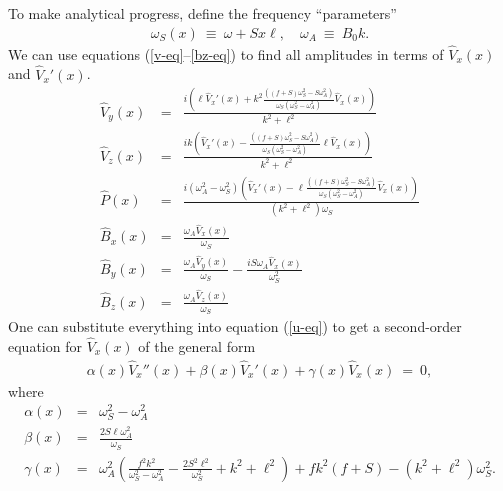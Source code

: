 \documentclass[openacc]{rsproca_new}%
\newcommand\Beq{\begin{eqnarray}}
\newcommand\Eeq{\end{eqnarray}}
\begin{document}
To make analytical progress, define the frequency ``parameters'' 
\Beq
\omega_{S}(x) \ \equiv \ \omega + S x \ell, \quad \omega_{A}  \ \equiv \ B_{0} k.
\Eeq
We can use equations (\ref{v-eq}--\ref{bz-eq}) to find all amplitudes in terms of $\hat{V}_{x}(x)$ and $\hat{V}_{x}'(x)$. 
\Beq
\hat{V}_{y}(x) &=& \frac{i \left(\ell 
   \hat{V}_{x}'(x) + k^{2} \frac{ \left((f+S) \omega
   _S^2-S \omega _A^2\right)}{\omega _S
   \left(\omega _S^2-\omega _A^2\right)} \hat{V}_{x}(x)\right)}{k^2+\ell ^2} \\
\hat{V}_{z}(x) &=& \frac{i k \left(\hat{V}_{x}'(x)- \frac{ \left((f+S) \omega
   _S^2-S \omega _A^2\right)}{\omega _S
   \left(\omega _S^2-\omega _A^2\right)}  \ell 
   \hat{V}_{x}(x)\right)}{k^2+\ell ^2} \\
   \hat{P}(x) &=& \frac{i \left(\omega _A^2-\omega _S^2\right)
   \left(\hat{V}_{x}'(x) -  \ell \frac{ \left((f+S) \omega
   _S^2-S \omega _A^2\right)}{\omega _S
   \left(\omega _S^2-\omega _A^2\right)}
   \hat{V}_{x}(x)\right)}{\left(k^2+\ell ^2\right)
   \omega _S} \\
   \hat{B}_{x}(x) &=& \frac{\omega _A \hat{V}_{x}(x)}{\omega _S} \\
   \hat{B}_{y}(x) &=&\frac{\omega _A \hat{V}_{y}(x)}{\omega _S} -\frac{i S \omega _A \hat{V}_{x}(x)}{\omega _S^2} \\
   \hat{B}_{z}(x) &=& \frac{\omega _A \hat{V}_{z}(x)}{\omega _S}
   \Eeq
One can substitute everything into equation (\ref{u-eq}) to get a second-order equation for $\hat{V}_{x}(x)$ of the general form 
\Beq
\alpha(x) \hat{V}_{x}''(x) + \beta(x) \hat{V}_{x}'(x) + \gamma(x) \hat{V}_{x}(x) \ = \ 0,
\Eeq
where
\Beq
\alpha(x) &=& \omega _S^2-\omega _A^2 \\ 
   \beta(x) &=& \frac{2 S \ell  \omega _A^2}{\omega _S} \\
   \gamma(x) &=& \omega _A^2 \left(\frac{f^2 k^2}{\omega
   _S^2-\omega _A^2}-\frac{2 S^2 \ell
   ^2}{\omega _S^2}+k^2+\ell ^2\right)+f k^2
   (f+S)-\left(k^2+\ell ^2\right) \omega _S^2.
\Eeq
\end{document}
